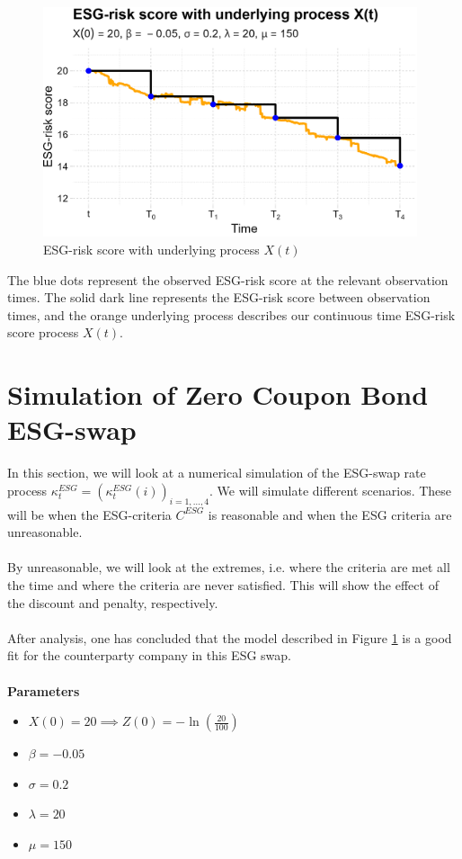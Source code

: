 \begin{figure}[htp]
    \centering
    \includegraphics[width=11cm]{figures/ESG/Trajectory_X(t)_params.png}
    \caption{ESG-risk score with underlying process $X(t)$}
    \label{fig: ESG_risk_score_underlying_X(t)}
\end{figure}

The blue dots represent the observed ESG-risk score at the relevant observation times. The solid dark line represents the ESG-risk score between observation times, and the orange underlying process describes our continuous time ESG-risk score process $X(t)$.  

\newpage 

\section{Simulation of Zero Coupon Bond ESG-swap}

In this section, we will look at a numerical simulation of the ESG-swap rate process $\kappa_{t}^{ESG} = (\kappa_{t}^{ESG}(i))_{i=1, \dots, 4}$. We will simulate different scenarios. These will be when the ESG-criteria $C^{ESG}$ is reasonable and when the ESG criteria are unreasonable. 
\\~\\
By unreasonable, we will look at the extremes, i.e. where the criteria are met all the time and where the criteria are never satisfied. This will show the effect of the discount and penalty, respectively. 
\\~\\ 
After analysis, one has concluded that the model described in Figure \ref{fig: ESG_risk_score_underlying_X(t)} is a good fit for the counterparty company in this ESG swap. 
\\~\\
\textbf{Parameters}
\begin{itemize}
    \item $X(0) = 20 \implies Z(0) = -\ln\left(\frac{20}{100}\right)$
    \item $\beta = -0.05$
    \item $\sigma = 0.2$
    \item $\lambda = 20$
    \item $\mu = 150$
\end{itemize}

